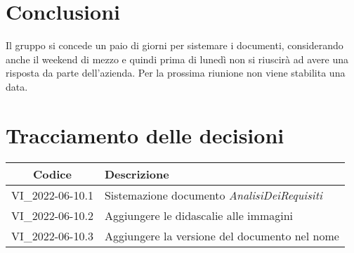 \section{Conclusioni}
Il gruppo si concede un paio di giorni per sistemare i documenti, considerando anche il weekend di mezzo e quindi prima di lunedì non si riuscirà ad avere una risposta da parte dell'azienda.
Per la prossima riunione non viene stabilita una data.
\newpage

\section*{Tracciamento delle decisioni}
	\renewcommand{\arraystretch}{1.8} %
	\begin{tabular}{ |c|l| }
		\hline
		\textbf{Codice} & \textbf{Descrizione} \\
		\hline
		VI\_2022-06-10.1 & Sistemazione documento \emph{AnalisiDeiRequisiti}\\ %
		\hline
		VI\_2022-06-10.2 & Aggiungere le didascalie alle immagini\\
		\hline
		VI\_2022-06-10.3 & Aggiungere la versione del documento nel nome\\
		\hline
	\end{tabular}